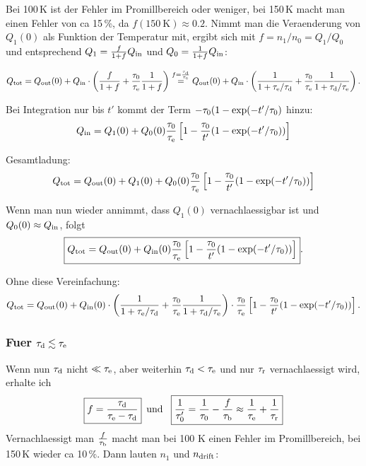 \noindent
Bei 100\,K ist der Fehler im Promillbereich oder weniger, bei 150\,K macht man einen Fehler von ca 15\,\%, da $f(\SI{150}{\kelvin}) \approx 0.2$. 
Nimmt man die Veraenderung von $Q_1(0)$ als Funktion der Temperatur mit, ergibt sich mit $f = n_1/n_0 = Q_1 / Q_0$ und entsprechend $Q_1 = \frac{f}{1+f}Q_{\textrm{in}}$ und $Q_0 = \frac{1}{1+f}Q_{\textrm{in}}$:

\begin{equation}
 Q_{\textrm{tot}} = Q_{\textrm{out}}(0) + Q_{\textrm{in}}\cdot \left( \frac{f}{1+f} + \frac{\tau_{0}}{\tau_\textrm{e}}\frac{1}{1+f}\right) 
 \stackrel{f = \frac{\tau_{\textrm{d}}}{\tau_\textrm{e}}}{=} 
 Q_{\textrm{out}}(0) + Q_{\textrm{in}}\cdot \left( \frac{1}{1+ \tau_\textrm{e}/\tau_{\textrm{d}}} + \frac{\tau_{0}}{\tau_\textrm{e}} \frac{1}{1 + \tau_{\textrm{d}}/\tau_\textrm{e}}\right).
\end{equation}

\noindent
Bei Integration nur bis $t'$ kommt der Term $-\tau_{0}(1-\exp(-t'/\tau_{0})$ hinzu:
\begin{equation}
 Q_{\textrm{in}} = Q_1(0) + Q_0(0) \frac{\tau_{0}}{\tau_\textrm{e}}\left[ 1 - \frac{\tau_{0}}{t'}(1 - \exp(-t'/\tau_{0})) \right]
\end{equation}

\noindent
Gesamtladung:
\begin{equation}
 Q_{\textrm{tot}} = Q_{\textrm{out}}(0) + Q_1(0) + Q_0(0) \frac{\tau_{0}}{\tau_\textrm{e}}\left[ 1 - \frac{\tau_{0}}{t'}(1 - \exp(-t'/\tau_{0})) \right]
\end{equation}

\noindent
Wenn man nun wieder annimmt, dass $Q_1(0)$ vernachlaessigbar ist und $Q_0(0) \approx Q_{\textrm{in}}$, folgt
\begin{equation}
 \boxed{Q_{\textrm{tot}} = Q_{\textrm{out}}(0) +  Q_{\textrm{in}}(0) \frac{\tau_{0}}{\tau_\textrm{e}}\left[ 1 - \frac{\tau_{0}}{t'}(1 - \exp(-t'/\tau_{0})) \right]}.
\end{equation}

\noindent
Ohne diese Vereinfachung:
\begin{equation}
 Q_{\textrm{tot}} = Q_{\textrm{out}}(0) +  Q_{\textrm{in}}(0) \cdot \left( \frac{1}{1+ \tau_\textrm{e}/\tau_{\textrm{d}}} + \frac{\tau_{0}}{\tau_\textrm{e}} \frac{1}{1 + \tau_{\textrm{d}}/\tau_\textrm{e}}\right) \cdot 
 \frac{\tau_{0}}{\tau_\textrm{e}} \left[ 1 - \frac{\tau_{0}}{t'}(1 - \exp(-t'/\tau_{0})) \right].
\end{equation}

\subsubsection{Fuer $\tau_{\textrm{d}} \lesssim \tau_\textrm{e}$}
Wenn nun $\tau_{\textrm{d}}$ nicht $\ll \tau_\textrm{e}$, aber weiterhin $\tau_{\textrm{d}} < \tau_\textrm{e}$ und nur $\tau_\textrm{r}$ vernachlaessigt wird, erhalte ich 
\begin{equation}
  \boxed{f = \frac{\tau_{\textrm{d}}}{\tau_\textrm{e} - \tau_{\textrm{d}}}} \,\,\,\textrm{und } \,\,\, \boxed{\frac{1}{\tau_{0}^{\prime}} = \frac{1}{\tau_{0}} - \frac{f}{\tau_{\textrm{b}}} \approx \frac{1}{\tau_\textrm{e}} + \frac{1}{\tau_\textrm{r}}}
\end{equation}
\noindent
Vernachlaessigt man $\frac{f}{\tau_{\textrm{b}}}$ macht man bei 100 K einen Fehler im Promillbereich, bei 150\,K wieder ca 10\,\%.
Dann lauten $n_1$ und $n_{{\textrm{drift}}}$:

